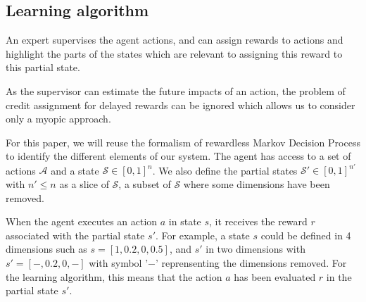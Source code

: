 \documentclass[letterpaper]{article} %
\begin{document}

\subsection{Learning algorithm}

An expert supervises the agent actions, and can assign rewards to actions and
highlight the parts of the states which are relevant to assigning this reward to
this partial state.

As the supervisor can estimate the future impacts of an action, the problem of
credit assignment for delayed rewards can be ignored which allows us to consider
only a myopic approach. 

For this paper, we will reuse the formalism of rewardless Markov Decision 
Process to identify the different elements of our system. The agent has access
to a set of actions $\mathcal{A}$ and a state $\mathcal{S} \in [0,1]^{n}$. We
also define the partial states $\mathcal{S'} \in [0,1]^{n'}$ with $n' \leq n$ as a
slice of $\mathcal{S}$, a subset of $\mathcal{S}$ where some dimensions have
been removed. 

When the agent executes an action $a$ in state $s$, it receives the reward $r$
associated with the partial state $s'$. For example, a state $s$ could be
defined in 4 dimensions such as ${s=[1,0.2,0,0.5]}$, and $s'$ in two dimensions with
${s'=[-,0.2,0,-]}$ with symbol '$-$' reprensenting the dimensions removed. For
the learning algorithm, this means that the action $a$ has been evaluated $r$ in
the partial state $s'$.  
\end{document}
